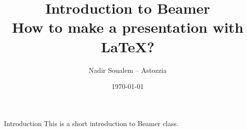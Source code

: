\documentclass{beamer}
\title[Make a LaTeX presentation using Beamer]{Introduction  to Beamer\\How to make a presentation with LaTeX?}
\author{Nadir Soualem -- Astozzia}
\institute{Math-linux.com}
\date{\today}
\begin{document}
\begin{frame}
\titlepage
\end{frame}


\begin{frame}{Introduction}
This is a short introduction to Beamer class.
\end{frame}
\end{document}
